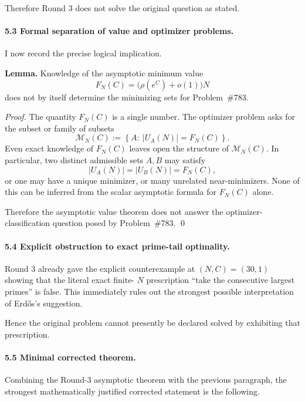 Therefore Round 3 does not solve the original question as stated.

\paragraph{5.3 Formal separation of value and optimizer problems.}

I now record the precise logical implication.

\medskip

\noindent\textbf{Lemma.}
Knowledge of the asymptotic minimum value
\[
F_N(C)=\bigl(\rho(e^C)+o(1)\bigr)N
\]
does not by itself determine the minimizing sets for Problem~\#783.

\medskip

\noindent\emph{Proof.}
The quantity $F_N(C)$ is a single number.  The optimizer problem asks for the subset or family of subsets
\[
\mathcal M_N(C):=\left\{A:\ |U_A(N)|=F_N(C)\right\}.
\]
Even exact knowledge of $F_N(C)$ leaves open the structure of $\mathcal M_N(C)$.  In particular, two distinct admissible sets $A,B$ may satisfy
\[
|U_A(N)|=|U_B(N)|=F_N(C),
\]
or one may have a unique minimizer, or many unrelated near-minimizers.  None of this can be inferred from the scalar asymptotic formula for $F_N(C)$ alone.

Therefore the asymptotic value theorem does not answer the optimizer-classification question posed by Problem~\#783. \qed

\paragraph{5.4 Explicit obstruction to exact prime-tail optimality.}

Round 3 already gave the explicit counterexample at $(N,C)=(30,1)$ showing that the literal exact finite-
$N$ prescription ``take the consecutive largest primes'' is false.  This immediately rules out the strongest possible interpretation of Erd\H{o}s's suggestion.

Hence the original problem cannot presently be declared solved by exhibiting that prescription.

\paragraph{5.5 Minimal corrected theorem.}

Combining the Round-3 asymptotic theorem with the previous paragraph, the strongest mathematically justified corrected statement is the following.

